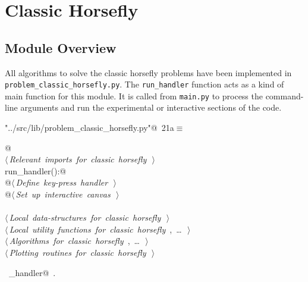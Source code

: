 \documentclass[11.5pt]{report}
\begin{document}
\chapter{Classic Horsefly}
\label{chap:classic-horsefly}

\section{Module Overview}

\newchunk 
All algorithms to solve the classic horsefly problems have been implemented in 
\verb|problem_classic_horsefly.py|. The \verb|run_handler| function acts 
as a kind of main function for this module. It is called from 
\verb|main.py| to process the command-line arguments and run the 
experimental or interactive sections of the code. 

\begin{flushleft} \small\label{scrap11}\raggedright\small
{} \verb@"../src/lib/problem_classic_horsefly.py"@\nobreak\ {\footnotesize {21a}}$\equiv$
\vspace{-1ex}
\begin{list}{}{} \item
\mbox{}\verb@    @\\
\mbox{}\verb@@\hbox{$\langle\,${\itshape Relevant imports for classic horsefly}\nobreak\ {\footnotesize {}}$\,\rangle$}\verb@@\\
\mbox{}\verb@def run_handler():@\\
\mbox{}\verb@    @\hbox{$\langle\,${\itshape Define key-press handler}\nobreak\ {\footnotesize {}}$\,\rangle$}\verb@@\\
\mbox{}\verb@    @\hbox{$\langle\,${\itshape Set up interactive canvas}\nobreak\ {\footnotesize {}}$\,\rangle$}\verb@@\\
\mbox{}\verb@@\\
\mbox{}\verb@@\hbox{$\langle\,${\itshape Local data-structures for classic horsefly}\nobreak\ {\footnotesize {}}$\,\rangle$}\verb@@\\
\mbox{}\verb@@\hbox{$\langle\,${\itshape Local utility functions for classic horsefly}\nobreak\ {\footnotesize {}, \ldots\ }$\,\rangle$}\verb@@\\
\mbox{}\verb@@\hbox{$\langle\,${\itshape Algorithms for classic horsefly}\nobreak\ {\footnotesize {}, \ldots\ }$\,\rangle$}\verb@@\\
\mbox{}\verb@@\hbox{$\langle\,${\itshape Plotting routines for classic horsefly}\nobreak\ {\footnotesize {}}$\,\rangle$}\verb@@\\
\mbox{}\verb@@{\NWsep}
\end{list}
\vspace{-1.5ex}
\footnotesize
\begin{list}{}{\setlength{\itemsep}{-\parsep}\setlength{\itemindent}{-\leftmargin}}
\item \NWtxtIdentsDefed\nobreak\  \verb@run_handler@\nobreak\ \NWtxtIdentsNotUsed.
\item{}
\end{list}
\vspace{4ex}
\end{flushleft}
\end{document}
